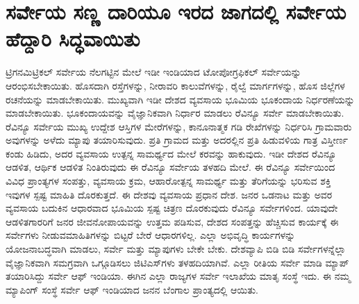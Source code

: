 
\chapter{ಸರ್ವೇಯ ಸಣ್ಣ ದಾರಿಯೂ ಇರದ ಜಾಗದಲ್ಲಿ ಸರ್ವೇಯ ಹೆದ್ದಾರಿ ಸಿದ್ಧವಾಯಿತು}

ಟ್ರಿಗನಮಿಟ್ರಿಕಲ್​ ಸರ್ವೇಯ ನೆಲಗಟ್ಟಿನ ಮೇಲೆ ಇಡೀ ಇಂಡಿಯಾದ ಟೋಪೋಗ್ರಫಿಕಲ್​ ಸರ್ವೇಯನ್ನು ಆರಂಭಿಸಬೇಕಾಯಿತು. ಹೊಸದಾಗಿ ರಸ್ತೆಗಳನ್ನು, ನೀರಾವರಿ ಕಾಲುವೆಗಳನ್ನು, ರೈಲ್ವೆ ಮಾರ್ಗಗಳನ್ನು, ಹೊಸ ಜಿಲ್ಲೆಗಳ ರಚನೆಯನ್ನು ಮಾಡಬೇಕಾಯಿತು. ಮುಖ್ಯವಾಗಿ ಇಡೀ ದೇಶದ ವ್ಯವಸಾಯ ಭೂಮಿಯ ಭೂಕಂದಾಯ ನಿರ್ಧರಣೆಯನ್ನು ಮಾಡಬೇಕಾಯಿತು. ಭೂಕಂದಾಯವನ್ನು ವೈಜ್ಞಾನಿಕವಾಗಿ ನಿರ್ಧಾರ ಮಾಡಲು ರೆವಿನ್ಯೂ ಸರ್ವೇ ಮಾಡಬೇಕಾಯಿತು. ರೆವಿನ್ಯೂ ಸರ್ವೇಯ ಮುಖ್ಯ ಉದ್ದೇಶ ಆಸ್ತಿಗಳ ಮೇರೆಗಳನ್ನು, ಕಾನೂನಾತ್ಮಕ ಗಡಿ ರೇಖೆಗಳನ್ನು ನಿರ್ಧರಿಸಿ ಗ್ರಾಮವಾರು ಅವುಗಳನ್ನು ಅಳೆದು ಮ್ಯಾಪು ತಯಾರಿಸುವುದು. ಪ್ರತಿ ಗ್ರಾಮದ ಮತ್ತು ಅದರಲ್ಲಿನ ಪ್ರತಿ ಹಿಡುವಳಿಯ ಗಾತ್ರ ವಿಸ್ತೀರ್ಣ ಕಂಡು ಹಿಡಿದು, ಅದರ ವ್ಯವಸಾಯ ಉತ್ಪನ್ನ ಸಾಮರ್ಥ್ಯದ ಮೇಲೆ ಕರವನ್ನು ಹಾಕುವುದು. ಇಡೀ ದೇಶದ ರೆವಿನ್ಯೂ ಆಡಳಿತ, ಆರ್ಥಿಕ ಆಡಳಿತ ನಿಂತಿರುವುದು ಈ ರೆವಿನ್ಯೂ ಸರ್ವೇಯ ತಳಹದಿ ಮೇಲೆ. ಈ ರೆವಿನ್ಯೂ ಸರ್ವೇಯಿಂದ ವಿವಿಧ ಪ್ರಾಂತ್ಯಗಳ ಸಂಪತ್ತು, ವ್ಯವಸಾಯ ಕ್ರಮ, ಆಹಾರೋತ್ಪನ್ನ ಸಾಮರ್ಥ್ಯ ಮತ್ತು ತೆರಿಗೆಯನ್ನು ಭರಿಸುವ ಶಕ್ತಿ ಇವುಗಳ ಸ್ಪಷ್ಟ ಮಾಹಿತಿ ದೊರಕುತ್ತದೆ. ಈ ದೇಶವು ವ್ಯವಸಾಯ ಪ್ರಧಾನ ದೇಶ. ಜನರ ಒಡನಾಟ ಮತ್ತು ಅವರ ವ್ಯವಸಾಯ ಬದುಕಿನ ಆಧಾರವಾದ ಭೂಮಿಯ ಸ್ಪಷ್ಟ ಚಿತ್ರಣ ದೊರಕುವುದು ರೆವಿನ್ಯೂ ಸರ್ವೇಗಳಿಂದ. ಯಾವುದೇ ಆಡಳಿತಗಾರರಿಗೆ ಜನರ ಜೀವನೋಪಾಯವನ್ನು ಉತ್ತಮ ಪಡಿಸುವ, ದೇಶದ ಸಂಪತ್ತನ್ನು ಹೆಚ್ಚಿಸುವ ಕಾರ್ಯಕ್ಕೆ ಈ ಸರ್ವೇಗಳು ನೀಡುವ\break ಮಾಹಿತಿಗಳನ್ನು ಬಿಟ್ಟರೆ ಬೇರೆ ಆಧಾರಗಳಿಲ್ಲ. ಎಲ್ಲಾ ಅಭಿವೃದ್ಧಿ ಕಾರ್ಯಗಳನ್ನು ಯೋಜನಾಬದ್ಧವಾಗಿ ಮಾಡಲು, ಸರ್ವೇ ಮತ್ತು ಮ್ಯಾಪುಗಳು ಬೇಕೇ ಬೇಕು. ದೇಶವ್ಯಾಪಿ ಬಿಡಿ ಬಿಡಿ ಸರ್ವೇಗಳನ್ನೆಲ್ಲಾ ವೈಜ್ಞಾನಿಕವಾಗಿ ಸಮಗ್ರವಾಗಿ ಒಗ್ಗೂಡಿಸಲು ಜಿಟಿಎಸ್​ಗಳು ತಳಹದಿಯಾಗಿವೆ. ಎಲ್ಲಾ ರೀತಿಯ ಸರ್ವೇ ಮಾಡಿ ಮ್ಯಾಪ್​ ತಯಾರಿಸಿದ್ದು ಸರ್ವೇ ಆಫ್​ ಇಂಡಿಯಾ. ಈಗಿನ ಎಲ್ಲಾ ರಾಜ್ಯಗಳ ಸರ್ವೇ ಇಲಾಖೆಯ ಮಾತೃ ಸಂಸ್ಥೆ ಇದು. ಈ ನಮ್ಮ ಮ್ಯಾಪಿಂಗ್​ ಸಂಸ್ಥೆ ಸರ್ವೇ ಆಫ್​ ಇಂಡಿಯಾದ ಜನನ ಬೆಂಗಾಲ ಪ್ರಾಂತ್ಯದಲ್ಲಿ ಆಯಿತು.

